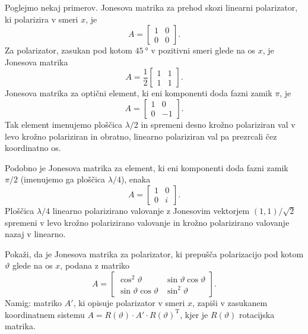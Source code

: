 Poglejmo nekaj primerov. Jonesova matrika za prehod skozi linearni polarizator, ki
polarizira v smeri $x$, je
\begin{equation}
A=\left[\begin{array}{cc}
1 & 0\\
0 & 0
\end{array}\right].
\end{equation}
Za polarizator, zasukan pod kotom $45~\si{\degree}$ v pozitivni 
smeri glede na os $x$, je Jonesova matrika
\begin{equation}
A=\frac{1}{2}\left[\begin{array}{cc}
1 & 1\\
1 & 1
\end{array}\right].
\end{equation}
Jonesova matrika za optični element, ki eni komponenti doda fazni zamik $\pi$, je
\begin{equation}
A=\left[\begin{array}{cc}
1 & 0\\
0 & -1
\end{array}\right].
\end{equation}
Tak element imenujemo ploščica $\lambda/2$ in 
spremeni desno krožno polariziran val v levo krožno
polariziran in obratno, linearno polariziran val pa prezrcali čez koordinatno os. 

Podobno je Jonesova matrika za element, ki eni komponenti doda fazni zamik $\pi/2$ 
(imenujemo ga ploščica $\lambda/4$), enaka
\begin{equation}
A=\left[\begin{array}{cc}
1 & 0\\
0 & i
\end{array}\right].
\end{equation}
Ploščica $\lambda/4$ linearno polarizirano valovanje z Jonesovim vektorjem $(1,1)/\sqrt{2}$
spremeni v levo krožno polarizirano valovanje in krožno polarizirano
valovanje nazaj v linearno. 

\begin{naloga}
Pokaži, da je Jonesova matrika za polarizator,
ki prepušča polarizacijo pod kotom $\vartheta$ glede na os $x$, podana z matriko
\begin{equation}
A=\left[\begin{array}{cc}
\cos^{2}\vartheta & \sin\vartheta\cos\vartheta\\
\sin\vartheta\cos\vartheta & \sin^{2}\vartheta
\end{array}\right].
\end{equation}
Namig: matriko $A'$, ki opisuje polarizator v smeri $x$, zapiši v zasukanem
koordinatnem sistemu $A=R(\vartheta) \cdot {A'}\cdot R(\vartheta)^\textrm{T}$, 
kjer je $R(\vartheta)$ rotacijska matrika.
\end{naloga}

